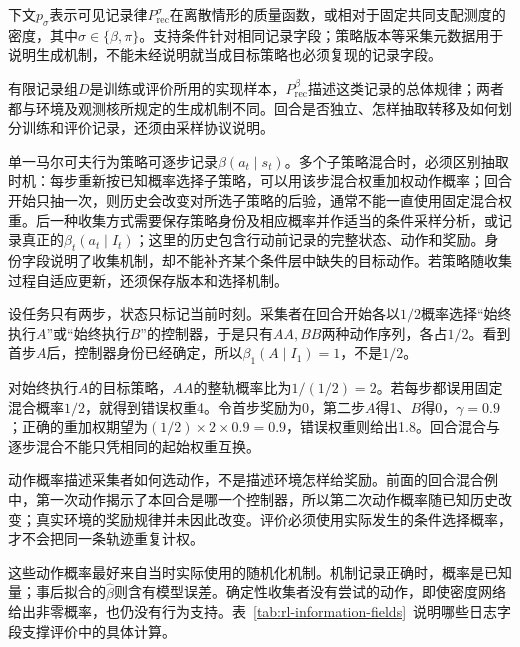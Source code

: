 下文$p_\sigma$表示可见记录律$P_{\mathrm{rec}}^\sigma$在离散情形的质量函数，或相对于固定共同支配测度的密度，其中$\sigma\in\{\beta,\pi\}$。支持条件针对相同记录字段；策略版本等采集元数据用于说明生成机制，不能未经说明就当成目标策略也必须复现的记录字段。

有限记录组$D$是训练或评价所用的实现样本，$P_{\mathrm{rec}}^\beta$描述这类记录的总体规律；两者都与环境及观测核所规定的生成机制不同。回合是否独立、怎样抽取转移及如何划分训练和评价记录，还须由采样协议说明。

单一马尔可夫行为策略可逐步记录$\beta(a_t\mid s_t)$。多个子策略混合时，必须区别抽取时机：每步重新按已知概率选择子策略，可以用该步混合权重加权动作概率；回合开始只抽一次，则历史会改变对所选子策略的后验，通常不能一直使用固定混合权重。后一种收集方式需要保存策略身份及相应概率并作适当的条件采样分析，或记录真正的$\beta_t(a_t\mid I_t)$；这里的历史包含行动前记录的完整状态、动作和奖励。身份字段说明了收集机制，却不能补齐某个条件层中缺失的目标动作。若策略随收集过程自适应更新，还须保存版本和选择机制。

\begin{example}[回合只抽一次控制器]
  \label{ex:rl-information-collector-mixture}
  设任务只有两步，状态只标记当前时刻。采集者在回合开始各以$1/2$概率选择“始终执行$A$”或“始终执行$B$”的控制器，于是只有$AA,BB$两种动作序列，各占$1/2$。看到首步$A$后，控制器身份已经确定，所以$\beta_1(A\mid I_1)=1$，不是$1/2$。

  对始终执行$A$的目标策略，$AA$的整轨概率比为$1/(1/2)=2$。若每步都误用固定混合概率$1/2$，就得到错误权重4。令首步奖励为0，第二步$A$得1、$B$得0，$\gamma=0.9$；正确的重加权期望为$(1/2)\times2\times0.9=0.9$，错误权重则给出1.8。回合混合与逐步混合不能只凭相同的起始权重互换。
\end{example}

动作概率描述采集者如何选动作，不是描述环境怎样给奖励。前面的回合混合例中，第一次动作揭示了本回合是哪一个控制器，所以第二次动作概率随已知历史改变；真实环境的奖励规律并未因此改变。评价必须使用实际发生的条件选择概率，才不会把同一条轨迹重复计权。

这些动作概率最好来自当时实际使用的随机化机制。机制记录正确时，概率是已知量；事后拟合的$\widehat\beta$则含有模型误差。确定性收集者没有尝试的动作，即使密度网络给出非零概率，也仍没有行为支持。表~\ref{tab:rl-information-fields}~说明哪些日志字段支撑评价中的具体计算。

